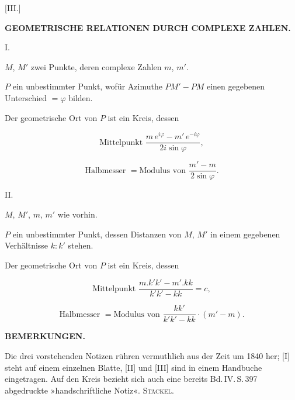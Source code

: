 
\begin{center}
[III.]

\textbf{GEOMETRISCHE RELATIONEN DURCH COMPLEXE ZAHLEN.}

I.
\end{center}

$M$, $M'$ zwei Punkte, deren complexe Zahlen $m$, $m'$.

$P$ ein unbestimmter Punkt, wof\"ur Azimuthe $PM'-PM$ einen gegebenen
Unterschied $= \varphi$ bilden.

Der geometrische Ort von $P$ ist ein Kreis, dessen

\[
\text{Mittelpunkt } \frac{m\,e^{i\varphi}-m'\,e^{-i\varphi}}{2i\sin\varphi},
\]

\[
\text{Halbmesser } = \text{Modulus von } \frac{m'-m}{2\sin\varphi}.
\]

\begin{center}
II.
\end{center}

$M$, $M'$, $m$, $m'$ wie vorhin.

$P$ ein unbestimmter Punkt, dessen Distanzen von $M$, $M'$ in einem gegebenen Verh\"altnisse $k:k'$ stehen.

Der geometrische Ort von $P$ ist ein Kreis, dessen

\[
\text{Mittelpunkt } \frac{m.k'k'-m'.kk}{k'k'-kk} = c,
\]

\[
\text{Halbmesser } = \text{Modulus von } \frac{kk'}{k'k'-kk}\cdot(m'-m).
\]



\begin{center}
\textbf{BEMERKUNGEN.}
\end{center}

Die drei vorstehenden Notizen r\"uhren vermuthlich aus der Zeit um 1840
her; [I] steht auf einem einzelnen Blatte, [II] und [III] sind in einem Handbuche
eingetragen. Auf den Kreis bezieht sich auch eine bereits Bd.\,IV.\,S.\,397 abgedruckte
»handschriftliche Notiz«. \hfill \textsc{Stäckel}.
